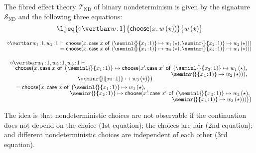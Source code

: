 \begin{example}
\label{ex:fibtheoryofnondeterminism}
The fibred effect theory $\mathcal{T}_{\text{ND}}$ of binary nondeterminism is given by the signature $\mathcal{S}_{\text{ND}}$ and the following three equations:
\[
\ljeq {\diamond \vertbar w \!:\! 1} {\mathsf{choose}(x .\, w\, (\star))} {w\, (\star)}
\vspace{0.15cm}
\]

\[
\begin{array}{c@{~} c@{~} l}
{\diamond \vertbar w_1 \!:\! 1, w_2 \!:\! 1} & \vdash & {\mathsf{choose}(x .\, \mathsf{case~} x \mathsf{~of}_{} \mathsf{~} ({\seminl {\!} {\!\!(x_1 \!:\! 1)} \mapsto w_1\, (\star)}, {\seminr {\!} {\!\!(x_2 \!:\! 1)} \mapsto w_2\, (\star)}))}
\\[-0.5mm]
& = & {\mathsf{choose}(x .\, \mathsf{case~} x \mathsf{~of}_{} \mathsf{~} ({\seminl {\!} {\!\!(x_1 \!:\! 1)} \mapsto w_2\, (\star)}, {\seminr {\!} {\!\!(x_2 \!:\! 1)} \mapsto w_1\, (\star)}))}
\end{array}
\vspace{0.15cm}
\]

\[
\begin{array}{c}
\hspace{-10cm}
{\diamond \vertbar w_1 \!:\! 1, w_2 \!:\! 1, w_3 \!:\! 1} \vdash 
\\[-1mm]
\hspace{0.2cm}
\mathsf{choose}\big(x .\, \mathsf{case~} x \mathsf{~of}_{} \mathsf{~} \big(\seminl {\!} {\!\!(x_1 \!:\! 1)} \mapsto 
\mathsf{choose}(x'\!  .\, \mathsf{case~} x' \mathsf{~of}_{} \mathsf{~} ({\seminl {\!} {\!\!(x_3 \!:\! 1)} \mapsto w_1\, (\star)}, 
\\[-0.5mm]
\hspace{9.7cm}
{\seminr {\!} {\!\!(x_4 \!:\! 1)} \mapsto w_2\, (\star)})), 
\\[-1.5mm]
\hspace{-1.75cm}
{\seminr {\!} {\!\!(x_2 \!:\! 1)} \mapsto w_3\, (\star)}\big)\big) 
\\[1mm]
\hspace{-5.95cm}
= \mathsf{choose}\big(x  .\, \mathsf{case~} x \mathsf{~of}_{} \mathsf{~} \big(\seminl {\!} {\!\!(x_1 \!:\! 1)} \mapsto w_1\, (\star), 
\\[-0.5mm]
\hspace{3.7cm}
\seminr {\!} {\!\!(x_2 \!:\! 1)} \mapsto \mathsf{choose}(x'\! .\, \mathsf{case~} x' \mathsf{~of}_{} \mathsf{~} ({\seminl {\!} {\!\!(x_3 \!:\! 1)} \mapsto w_2\, (\star)}, 
\\[-0.5mm]
\hspace{10.05cm}
{\seminr {\!} {\!\!(x_4 \!:\! 1)} \mapsto w_3\, (\star)}))\big)\big)
\end{array}
\]

The idea is that nondeterministic choices are not observable if the continuation does not depend on the choice (1st equation); the choices are fair (2nd equation); and different nondeterministic choices are independent of each other (3rd equation).
\end{example}

